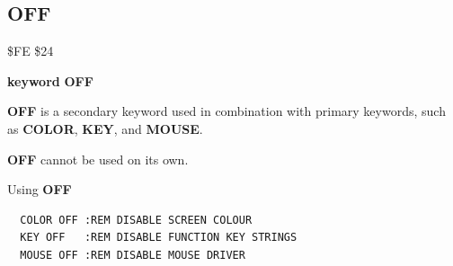 
\newpage
\subsection{OFF}
\begin{description}[leftmargin=2cm,style=nextline]
\item [Token:] \$FE \$24
\item [Format:] {\bf keyword} {\bf OFF}
\item [Usage:]  {\bf OFF} is a secondary keyword used in
                combination with primary keywords, such as
                {\bf COLOR}, {\bf KEY}, and  {\bf MOUSE}.

\item [Remarks:] {\bf OFF} cannot be used on its own.

\item [Examples:] Using {\bf OFF}

\begin{tcolorbox}[colback=black,coltext=white]
\verbatimfont{\codefont}
\begin{verbatim}
  COLOR OFF :REM DISABLE SCREEN COLOUR
  KEY OFF   :REM DISABLE FUNCTION KEY STRINGS
  MOUSE OFF :REM DISABLE MOUSE DRIVER
\end{verbatim}
\end{tcolorbox}
\end{description}


\newpage
